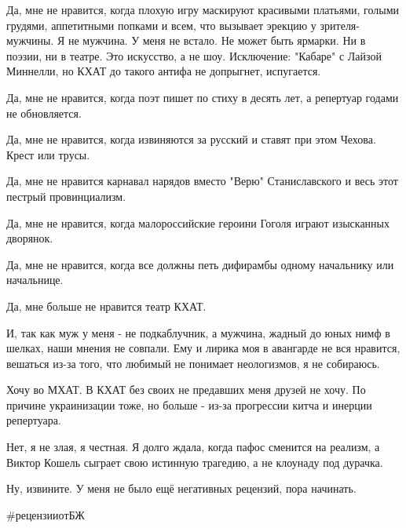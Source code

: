 Да, мне не нравится, когда плохую игру маскируют красивыми платьями, голыми
грудями, аппетитными попками и всем, что вызывает эрекцию у зрителя-мужчины. Я
не мужчина. У меня не встало. Не может быть ярмарки. Ни в поэзии, ни в театре.
Это искусство, а не шоу. Исключение: "Кабаре" с Лайзой Миннелли, но КХАТ до
такого антифа не допрыгнет, испугается.

Да, мне не нравится, когда поэт пишет по стиху в десять лет, а репертуар годами
не обновляется.

Да, мне не нравится, когда извиняются за русский и ставят при этом Чехова.
Крест или трусы.

Да, мне не нравится карнавал нарядов вместо "Верю" Станиславского и весь этот
пестрый провинциализм.

Да, мне не нравится, когда малороссийские героини Гоголя играют изысканных
дворянок.

Да, мне не нравится, когда все должны петь дифирамбы одному начальнику или
начальнице.

Да, мне больше не нравится театр КХАТ.

И, так как муж у меня - не подкаблучник, а мужчина, жадный до юных нимф в
шелках, наши мнения не совпали. Ему и лирика моя в авангарде не вся нравится,
вешаться из-за того, что любимый не понимает неологизмов, я не собираюсь.

Хочу во МХАТ. В КХАТ без своих не предавших меня друзей не хочу. По причине
украинизации тоже, но больше - из-за прогрессии китча и инерции репертуара.

Нет, я не злая, я честная. Я долго ждала, когда пафос сменится на реализм, а
Виктор Кошель сыграет свою истинную трагедию, а не клоунаду под дурачка.

Ну, извините. У меня не было ещё негативных рецензий, пора начинать.

\#рецензииотБЖ

